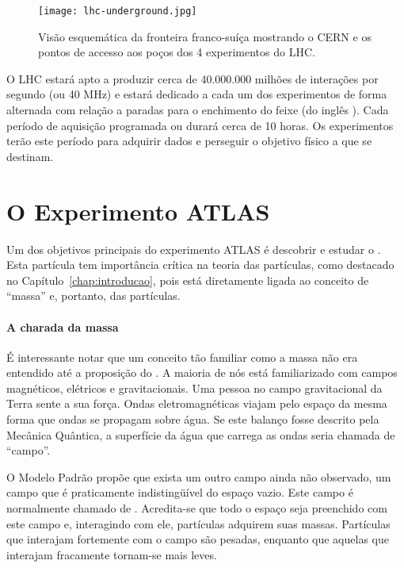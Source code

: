 \begin{figure}
\begin{center}
\texttt{[image: lhc-underground.jpg]}
\end{center}
\caption{Visão esquemática da fronteira franco-suíça mostrando o CERN e os
pontos de accesso aos poços dos 4 experimentos do LHC.}
\label{fig:aerial}
\end{figure}

O LHC estará apto a produzir cerca de 40.000.000 milhões de interações por
segundo (ou 40 MHz) e estará dedicado a cada um dos experimentos de forma
alternada com relação a paradas para o enchimento do feixe (do inglês
). Cada período de aquisição programada ou  durará
cerca de 10 horas. Os experimentos terão este período para adquirir dados e
perseguir o objetivo físico a que se destinam.

\section{O Experimento ATLAS}

Um dos objetivos principais do experimento ATLAS é descobrir e estudar o
. Esta partícula tem importância crítica na teoria das
partículas, como destacado no Capítulo~\ref{chap:introducao}, pois está
diretamente ligada ao conceito de ``massa'' e,
portanto, das partículas.

\paragraph{A charada da massa} É interessante notar que um conceito tão
familiar como a massa não era entendido até a proposição do . A maioria de nós está familiarizado com campos magnéticos, elétricos
e gravitacionais. Uma pessoa no campo gravitacional da Terra sente a sua
força. Ondas eletromagnéticas viajam pelo espaço da mesma forma que ondas
se propagam sobre água. Se este balanço fosse descrito pela Mecânica Quântica,
a superfície da água que carrega as ondas seria chamada de ``campo''.

O Modelo Padrão propõe que exista um outro campo ainda não observado, um campo
que é praticamente indistingüível do espaço vazio. Este campo é normalmente
chamado de . Acredita-se que todo o espaço seja preenchido
com este campo e, interagindo com ele, partículas adquirem suas
massas. Partículas que interajam fortemente com o campo são pesadas, enquanto
que aquelas que interajam fracamente tornam-se mais leves.

